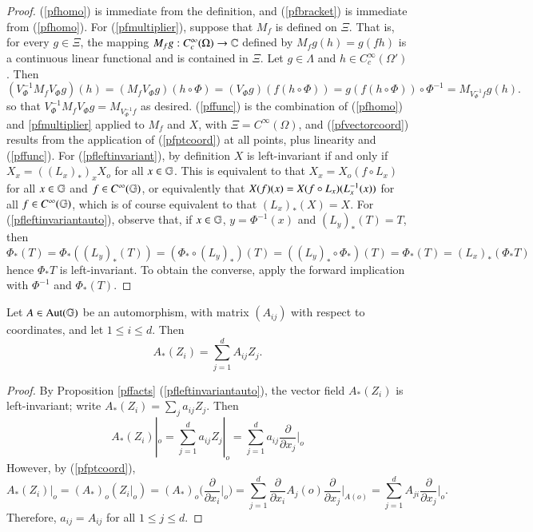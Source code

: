 \documentclass[leqno]{amsart}
\begin{document}
	\begin{proof}
		(\ref{pfhomo}) is immediate from the definition, and (\ref{pfbracket}) is immediate from (\ref{pfhomo}). For (\ref{pfmultiplier}), suppose that $M_f$ is defined on $\Xi$. That is, for every $g\in \Xi$, the mapping $M_fg:C_c^\infty(\Omega)\to\mathbb{C}$ defined by $M_fg(h)=g(fh)$ is a continuous linear functional and is contained in $\Xi$. Let $g\in \Lambda$ and $h\in C^\infty_c(\Omega')$. Then
		$$(V_\Phi^{-1}M_fV_\Phi g)(h)=(M_fV_\Phi g)(h\circ \Phi)=(V_\Phi g)(f(h\circ \Phi))=g(f(h\circ \Phi))\circ\Phi^{-1}=M_{V_\Phi^{-1}f}g(h).$$
		so that $V_\Phi^{-1}M_fV_\Phi g=M_{V_\Phi^{-1}f}$ as desired.
		(\ref{pffunc}) is the combination of (\ref{pfhomo}) and \ref{pfmultiplier} applied to $M_f$ and $X$, with $\Xi=C^\infty(\Omega)$, and (\ref{pfvectorcoord}) results from the application of (\ref{pfptcoord}) at all points, plus linearity and (\ref{pffunc}). For (\ref{pfleftinvariant}), by definition $X$ is left-invariant if and only if $X_x=((L_x)_*)_xX_o$ for all $x\in\mathbb{G}$. This is equivalent to that $X_x=X_o(f\circ L_x)$ for all $x\in\mathbb{G}$ and $f\in C^\infty(\mathbb{G})$, or equivalently that $X(f)(x)=X(f\circ L_x)(L_x^{-1}(x))$ for all $f\in C^\infty(\mathbb{G})$, which is of course equivalent to that $(L_x)_*(X)=X$. For (\ref{pfleftinvariantauto}), observe that, if $x\in \mathbb{G}$, $y=\Phi^{-1}(x)$ and $(L_y)_*(T)=T$, then
		$$\Phi_*(T)=\Phi_*((L_y)_*(T))=(\Phi_*\circ (L_y)_*)(T)=((L_{y})_*\circ \Phi_*)(T)=\Phi_*(T)=(L_{x})_*(\Phi_*T)$$
		hence $\Phi_*T$ is left-invariant. To obtain the converse, apply the forward implication with $\Phi^{-1}$ and $\Phi_*(T)$.
		
	\end{proof}
	
	\begin{proposition}\label{automorphism push-formawrd}
		Let $A\in\rm Aut(\mathbb{G})$ be an automorphism, with matrix $(A_{ij})$ with respect to \named coordinates, and let $1\leq i\leq d$. Then
		$$A_*(Z_i)=\sum_{j=1}^d A_{ij}Z_j.$$
	\end{proposition}
	\begin{proof}
		By Proposition \ref{pffacts} (\ref{pfleftinvariantauto}), the vector field $A_*(Z_i)$ is left-invariant; write $\displaystyle A_*(Z_i)=\sum_j a_{ij}Z_j$. Then
		$$A_*(Z_i)|_o=\sum_{j=1}^d a_{ij}Z_j|_o=\sum_{j=1}^d a_{ij}\frac{\partial}{\partial x_j}\bigg|_o$$
		However, by (\ref{pfptcoord}), 
		$$A_*(Z_i)|_o=(A_*)_o(Z_i|_o)=(A_*)_o\biggl(\frac{\partial}{\partial x_i}\bigg|_o\biggr)=\sum_{j=1}^d\frac{\partial}{\partial x_i} A_j(o)\frac{\partial}{\partial x_j}\bigg|_{A(o)}=\sum_{j=1}^dA_{ji}\frac{\partial}{\partial x_j}\bigg|_{o}.$$
		Therefore, $a_{ij}=A_{ij}$ for all $1\leq j\leq d$.
	\end{proof}
	
\end{document}
